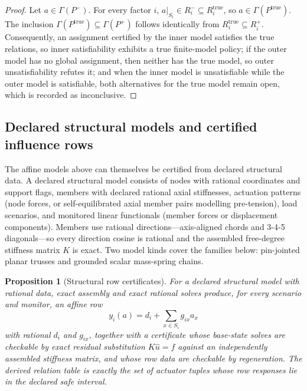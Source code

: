 \documentclass[11pt]{article}
\theoremstyle{plain}
\newtheorem{proposition}[theorem]{Proposition}
\theoremstyle{definition}
\theoremstyle{remark}
\begin{document}
\begin{proof}
Let \(a\in\Gamma(P^-)\).  For every factor \(i\),
\(a|_{S_i}\in R_i^-\subseteq R_i^{\mathrm{true}}\), so
\(a\in\Gamma(P^{\mathrm{true}})\).  The inclusion
\(\Gamma(P^{\mathrm{true}})\subseteq\Gamma(P^+)\) follows identically from
\(R_i^{\mathrm{true}}\subseteq R_i^+\).  Consequently, an assignment certified
by the inner model satisfies the true relations, so inner satisfiability
exhibits a true finite-model policy; if the outer model has no global
assignment, then neither has the true model, so outer unsatisfiability refutes
it; and when the inner model is unsatisfiable while the outer model is
satisfiable, both alternatives for the true model remain open, which is
recorded as inconclusive.
\end{proof}

\subsection{Declared structural models and certified influence rows}
\label{subsec:structural-front-end}

The affine models above can themselves be certified from declared structural
data.  A declared structural model consists of nodes with rational
coordinates and support flags, members with declared rational axial
stiffnesses, actuation patterns (node forces, or self-equilibrated axial
member pairs modelling pre-tension), load scenarios, and monitored linear
functionals (member forces or displacement components).  Members use rational
directions---axis-aligned chords and 3-4-5 diagonals---so every direction
cosine is rational and the assembled free-degree stiffness matrix \(K\) is
exact.  Two model kinds cover the families below: pin-jointed planar trusses
and grounded scalar mass-spring chains.

\begin{proposition}[Structural row certificates]
\label{prop:structural-row-certificates}
For a declared structural model with rational data, exact assembly and exact
rational solves produce, for every scenario and monitor, an affine row
\[
  y_i(a)=d_i+\sum_{x\in S_i}g_{ix}a_x
\]
with rational \(d_i\) and \(g_{ix}\), together with a certificate whose
base-state solves are checkable by exact residual substitution
\(K\widehat u=f\) against an independently assembled stiffness matrix, and
whose row data are checkable by regeneration.  The derived relation table is
exactly the set of actuator tuples whose row responses lie in the declared
safe interval.
\end{proposition}
\end{document}
